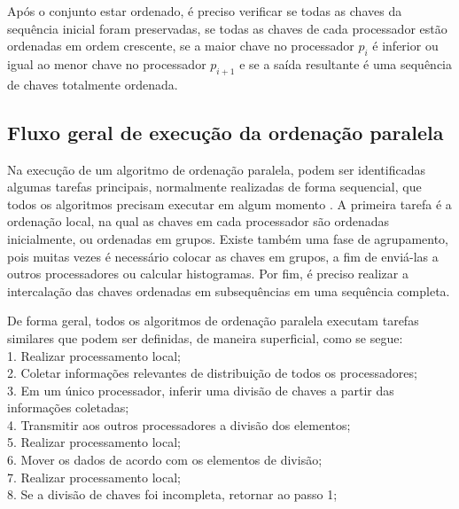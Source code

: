 Após o conjunto estar ordenado, é preciso verificar se todas as chaves da sequência inicial foram preservadas, se todas as chaves de cada processador estão ordenadas em ordem crescente, se a maior chave no processador $p_{i}$ é inferior ou igual ao menor chave no processador $p_{i+1}$ e se a saída resultante é uma sequência de chaves totalmente ordenada.


\subsection{Fluxo geral de execução da ordenação paralela}

Na execução de um algoritmo de ordenação paralela, podem ser identificadas algumas tarefas principais, normalmente realizadas de forma sequencial, que todos os algoritmos precisam executar em algum momento \cite{Kale:2010}. 
A primeira tarefa é a ordenação local, na qual as chaves em cada processador são ordenadas inicialmente, ou ordenadas em grupos.
Existe também uma fase de agrupamento, pois muitas vezes é necessário colocar as chaves em grupos, a fim de enviá-las a outros processadores ou calcular histogramas. Por fim, é preciso realizar a intercalação das chaves ordenadas em subsequências em uma sequência completa.


De forma geral, todos os algoritmos de ordenação paralela executam tarefas similares que podem ser definidas, de maneira superficial, como se segue: 
\\1. Realizar processamento local;
\\2. Coletar informações relevantes de distribuição de todos os processadores;
\\3. Em um único processador, inferir uma divisão de chaves a partir das informações coletadas;
\\4. Transmitir aos outros processadores a divisão dos elementos;
\\5. Realizar processamento local;
\\6. Mover os dados de acordo com os elementos de divisão;
\\7. Realizar processamento local;
\\8. Se a divisão de chaves foi incompleta, retornar ao passo 1;


